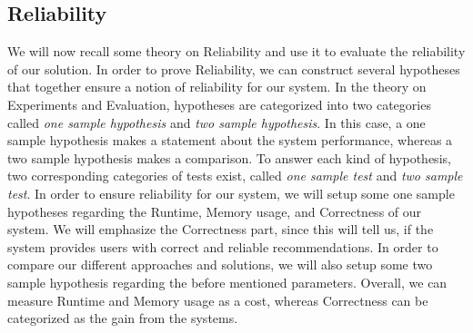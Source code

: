 \subsection{Reliability}
We will now recall some theory on Reliability and use it to evaluate the reliability of our solution. In order to prove Reliability, we can construct several hypotheses that together ensure a notion of reliability for our system. In the theory on
Experiments and Evaluation, hypotheses are categorized into two categories called \textit{one sample hypothesis} and \textit{two sample hypothesis}. In this case, a one sample hypothesis makes a statement about the system performance, whereas a two sample hypothesis makes a comparison. To answer each kind of hypothesis, two corresponding categories of tests exist, called \textit{one sample test} and \textit{two sample test}.
In order to ensure reliability for our system, we will setup some one sample hypotheses regarding the Runtime, Memory usage, and Correctness of our system. We will emphasize the Correctness part, since this will tell us, if the system provides users with correct and reliable recommendations. In order to compare our different approaches and solutions, we will also setup some two sample hypothesis regarding the before mentioned parameters. Overall, we can measure Runtime and Memory usage as a cost, whereas Correctness can be categorized as the gain from the systems.
